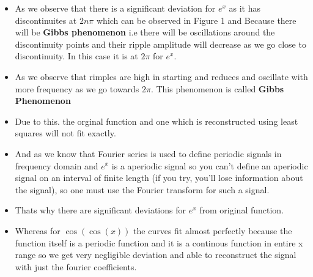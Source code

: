 \documentclass[a4paper]{article}
\providecommand{\tightlist}{%
      \setlength{\itemsep}{0pt}\setlength{\parskip}{0pt}}
\begin{document}
\begin{itemize}
\tightlist
\item
  As we observe that there is a significant deviation for \(e^{x}\) as
  it has discontinuites at \(2n\pi\) which can be observed in Figure 1
  and Because there will be \textbf{Gibbs phenomenon} i.e there will be
  oscillations around the discontinuity points and their ripple
  amplitude will decrease as we go close to discontinuity. In this case
  it is at \(2\pi\) for \(e^{x}\).
\item
  As we observe that rimples are high in starting and reduces and
  oscillate with more frequency as we go towards \(2\pi\). This
  phenomenon is called \textbf{Gibbs Phenomenon}
\item
  Due to this. the orginal function and one which is reconstructed using
  least squares will not fit exactly.
\item
  And as we know that Fourier series is used to define periodic signals
  in frequency domain and \(e^{x}\) is a aperiodic signal so you can't
  define an aperiodic signal on an interval of finite length (if you
  try, you'll lose information about the signal), so one must use the
  Fourier transform for such a signal.
\item
  Thats why there are significant deviations for \(e^{x}\) from original
  function.
\item
  Whereas for \(\cos(\cos(x))\) the curves fit almost perfectly because
  the function itself is a periodic function and it is a continous
  function in entire x range so we get very negligible deviation and
  able to reconstruct the signal with just the fourier coefficients.
\end{itemize}


    
    
    
    
\end{document}

